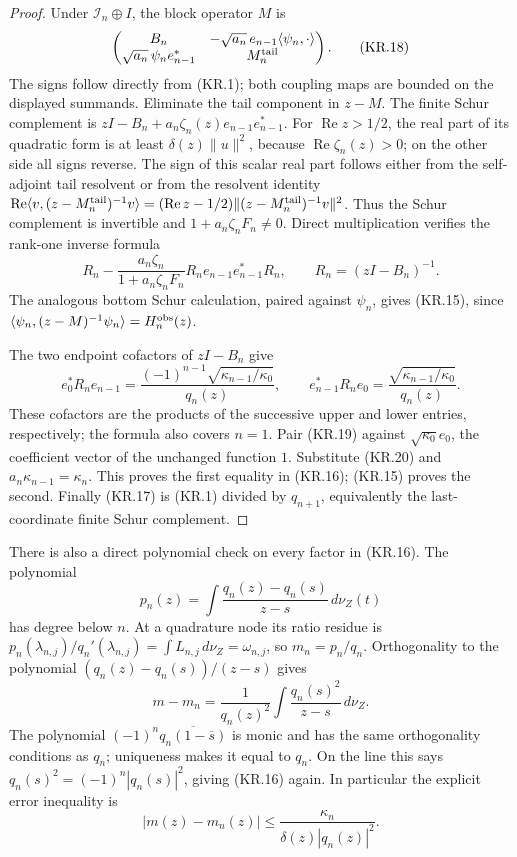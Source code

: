 \begin{proof}
Under \(\mathcal I_n\oplus I\), the block operator \(M\) is
\[
 \begin{pmatrix}
 B_n&-\sqrt{a_n}\,e_{n-1}\langle\psi_n,\cdot\rangle\\
 \sqrt{a_n}\,\psi_ne_{n-1}^*&M_n^{\rm tail}
 \end{pmatrix}.                                         \tag{KR.18}
\]
The signs follow directly from (KR.1); both coupling maps are
bounded on the displayed summands.  Eliminate the tail component
in \(z-M\).  The finite Schur complement is
\(zI-B_n+a_n\zeta_n(z)e_{n-1}e_{n-1}^*\).
For \(\operatorname{Re}z>1/2\), the real part of its quadratic
form is at least \(\delta(z)\|u\|^2\), because
\(\operatorname{Re}\zeta_n(z)>0\); on the other side all signs
reverse.  The sign of this scalar real part follows either from
the self-adjoint tail resolvent or from the resolvent identity
\(\operatorname{Re}\langle v,(z-M_n^{\rm tail})^{-1}v\rangle
=(\operatorname{Re}z-1/2)\|(z-M_n^{\rm tail})^{-1}v\|^2\).
Thus the Schur complement is invertible and
\(1+a_n\zeta_nF_n\ne0\).
Direct multiplication verifies the rank-one inverse formula
\[
 R_n-\frac{a_n\zeta_n}{1+a_n\zeta_nF_n}
                   R_ne_{n-1}e_{n-1}^*R_n,
 \qquad R_n=(zI-B_n)^{-1}.                               \tag{KR.19}
\]
The analogous bottom Schur calculation, paired against
\(\psi_n\), gives (KR.15), since
\(\langle\psi_n,(z-M)^{-1}\psi_n\rangle=H_n^{\rm obs}(z)\).

The two endpoint cofactors of \(zI-B_n\) give
\[
 e_0^*R_ne_{n-1}
   =\frac{(-1)^{n-1}\sqrt{\kappa_{n-1}/\kappa_0}}{q_n(z)},
 \qquad
 e_{n-1}^*R_ne_0
   =\frac{\sqrt{\kappa_{n-1}/\kappa_0}}{q_n(z)}.           \tag{KR.20}
\]
These cofactors are the products of the successive upper and
lower entries, respectively; the formula also covers \(n=1\).
Pair (KR.19) against \(\sqrt{\kappa_0}e_0\), the coefficient
vector of the unchanged function \(1\).  Substitute (KR.20)
and \(a_n\kappa_{n-1}=\kappa_n\).  This proves the first
equality in (KR.16); (KR.15) proves the second.
Finally (KR.17) is (KR.1) divided by \(q_{n+1}\), equivalently
the last-coordinate finite Schur complement.
\end{proof}

There is also a direct polynomial check on every factor in
(KR.16).  The polynomial
\[
 p_n(z)=\int\frac{q_n(z)-q_n(s)}{z-s}\,d\nu_Z(t)
\]
has degree below \(n\).  At a quadrature node its ratio residue
is \(p_n(\lambda_{n,j})/q_n'(\lambda_{n,j})
=\int L_{n,j}\,d\nu_Z=\omega_{n,j}\), so \(m_n=p_n/q_n\).
Orthogonality to the polynomial
\((q_n(z)-q_n(s))/(z-s)\) gives
\[
 m-m_n=\frac1{q_n(z)^2}
                       \int\frac{q_n(s)^2}{z-s}\,d\nu_Z.
\]
The polynomial
\((-1)^n\overline{q_n(1-\overline s)}\) is monic and has
the same orthogonality conditions as \(q_n\); uniqueness makes
it equal to \(q_n\).  On the line this says
\(q_n(s)^2=(-1)^n|q_n(s)|^2\), giving (KR.16) again.
In particular the explicit error inequality is
\[
 |m(z)-m_n(z)|\leq
       \frac{\kappa_n}{\delta(z)|q_n(z)|^2}.              \tag{KR.21}
\]

